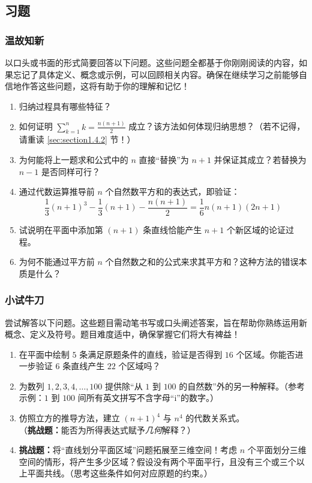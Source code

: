 \subsection{习题}

\subsubsection*{温故知新}

以口头或书面的形式简要回答以下问题。这些问题全都基于你刚刚阅读的内容，如果忘记了具体定义、概念或示例，可以回顾相关内容。确保在继续学习之前能够自信地作答这些问题，这将有助于你的理解和记忆！

\begin{enumerate}[label=(\arabic*)]
    \item 归纳过程具有哪些特征？
    \item 如何证明 $\sum_{k=1}^{n}k = \frac{n(n+1)}{2}$ 成立？该方法如何体现归纳思想？（若不记得，请重读 \ref{sec:section1.4.2} 节！）
    \item 为何能将上一题求和公式中的 $n$ 直接``替换''为 $n+1$ 并保证其成立？若替换为 $n - 1$ 是否同样可行？
    \item 通过代数运算推导前 $n$ 个自然数平方和的表达式，即验证：
    \[\frac{1}{3}(n+1)^3-\frac{1}{3}(n+1)-\frac{n(n+1)}{2} = \frac{1}{6}n(n+1)(2n+1)\]
    \item 试说明在平面中添加第 $(n+1)$ 条直线恰能产生 $n+1$ 个新区域的论证过程。
    \item 为何不能通过平方前 $n$ 个自然数之和的公式来求其平方和？这种方法的错误本质是什么？
\end{enumerate}

\subsubsection*{小试牛刀}

尝试解答以下问题。这些题目需动笔书写或口头阐述答案，旨在帮助你熟练运用新概念、定义及符号。题目难度适中，确保掌握它们将大有裨益！

\begin{enumerate}[label=(\arabic*)]
    \item 在平面中绘制 $5$ 条满足原题条件的直线，验证是否得到 $16$ 个区域。你能否进一步验证 $6$ 条直线产生 $22$ 个区域吗？
    \item 为数列 $1, 2, 3, 4, \dots , 100$ 提供除``从 $1$ 到 $100$ 的自然数''外的另一种解释。（参考示例：$1$ 到 $100$ 间所有英文拼写不含字母``i''的数字。）
    \item 仿照立方的推导方法，建立 $(n + 1)^4$ 与 $n^4$ 的代数关系式。\\
    （\textbf{挑战题：}能否为所得表达式赋予\emph{几何}解释？）
    \item \textbf{挑战题：}将``直线划分平面区域''问题拓展至三维空间！考虑 $n$ 个平面划分三维空间的情形，将产生多少区域？假设没有两个平面平行，且没有三个或三个以上平面共线。（思考这些条件如何对应原题的约束。）
\end{enumerate}